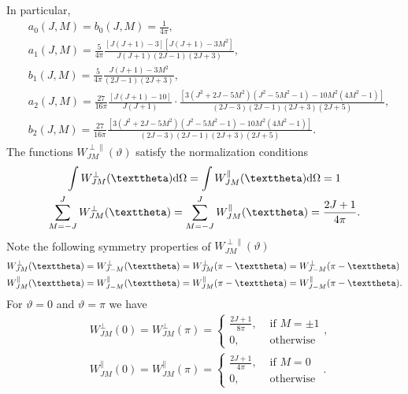 In particular,
\begin{align}
& a_{0}(J, M)=b_{0}(J, M)=\frac{1}{4 \pi} , \label{eq:7:3:159}\\
& a_{1}(J, M)=\frac{5}{4 \pi} \frac{[J(J+1)-3]\left[J(J+1)-3 M^{2}\right]}{J(J+1)(2 J-1)(2 J+3)} , \label{eq:7:3:160}\\
& b_{1}(J, M)=\frac{5}{4 \pi} \frac{J(J+1)-3 M^{2}}{(2 J-1)(2 J+3)} , \label{eq:7:3:161}\\
& a_{2}(J, M)=\frac{27}{16 \pi} \frac{[J(J+1)-10]}{J(J+1)} \cdot \frac{\left[3\left(J^{2}+2 J-5 M^{2}\right)\left(J^{2}-5 M^{2}-1\right)-10 M^{2}\left(4 M^{2}-1\right)\right]}{(2 J-3)(2 J-1)(2 J+3)(2 J+5)} , \label{eq:7:3:162}\\
& b_{2}(J, M)=\frac{27}{16 \pi} \frac{\left[3\left(J^{2}+2 J-5 M^{2}\right)\left(J^{2}-5 M^{2}-1\right)-10 M^{2}\left(4 M^{2}-1\right)\right]}{(2 J-3)(2 J-1)(2 J+3)(2 J+5)}. \label{eq:7:3:163}
\end{align}
The functions $W_{J M}^{\perp \|}(\vartheta)$ satisfy the normalization conditions
\begin{gather}
\int W_{J M}^{\perp}(\vartheta) \dd \Omega=\int W_{J M}^{\|}(\vartheta) \dd \Omega=1  \notag\\
\sum_{M=-J}^{J} W_{J M}^{\perp}(\vartheta)=\sum_{M=-J}^{J} W_{J M}^{\|}(\vartheta)=\frac{2 J+1}{4 \pi}. \label{eq:7:3:164}
\end{gather}
Note the following symmetry properties of $W_{J M}^{\perp \|}(\vartheta)$
\begin{align}
& W_{J M}^{\perp}(\vartheta)=W_{J-M}^{\perp}(\vartheta)=W_{J M}^{\perp}(\pi-\vartheta)=W_{J-M}^{\perp}(\pi-\vartheta)  \notag\\
& W_{J M}^{\|}(\vartheta)=W_{J-M}^{\|}(\vartheta)=W_{J M}^{\|}(\pi-\vartheta)=W_{J-M}^{\|}(\pi-\vartheta). \label{eq:7:3:165}
\end{align}
For $\vartheta=0$ and $\vartheta=\pi$ we have
\begin{align}
& W_{J M}^{\perp}(0)=W_{J M}^{\perp}(\pi)= \begin{cases}\frac{2 J+1}{8 \pi}, & \text { if } M= \pm 1 \\
0, & \text { otherwise }\end{cases},  \label{eq:7:3:166}\\
& W_{J M}^{\|}(0)=W_{J M}^{\|}(\pi)= \begin{cases}\frac{2 J+1}{4 \pi}, & \text { if } M=0 \\
0, & \text { otherwise }\end{cases}. \label{eq:7:3:167}
\end{align}
